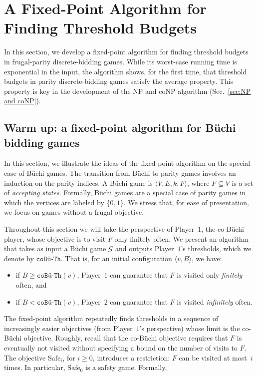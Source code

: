 \documentclass{theoretics}
\newcommand{\PO}{Player~$1$\xspace}
\newcommand{\PT}{Player~$2$\xspace}
\newcommand{\G}{{\mathcal G}}
\newcommand{\coTh}{\texttt{coB\"u-Th}}
\newcommand{\safe}{\text{Safe}}
\newcommand{\zug}[1]{\langle #1  \rangle}
\renewcommand{\set}[1]{\{ #1  \}}
\begin{document}
\section{A Fixed-Point Algorithm for Finding Threshold Budgets}
In this section, we develop a fixed-point algorithm for finding threshold budgets in frugal-parity discrete-bidding games. While its worst-case running time is exponential in the input, the algorithm shows, for the first time, that threshold budgets in parity discrete-bidding games satisfy the average property. This property is key in the development of the NP and coNP algorithm (Sec.~\ref{sec:NP and coNP}). 


\subsection{Warm up: a fixed-point algorithm for B\"uchi bidding games}
\label{sec:Buchi}
In this section, we illustrate the ideas of the fixed-point algorithm on the special case of B\"uchi games. The transition from B\"uchi to parity games involves an induction on the parity indices. A B\"uchi game is $\zug{V, E, k, F}$, where $F \subseteq V$ is a set of {\em accepting states}. Formally, B\"uchi games are a special case of parity games in which the vertices are labeled by $\set{0,1}$. We stress that, for ease of presentation, we focus on games without a frugal objective.

Throughout this section we will take the perspective of \PO, the co-B\"uchi player, whose objective is to visit $F$ only finitely often. We present an algorithm that takes as input a B\"uchi game $\G$ and outputs \PO's thresholds, which we denote by $\coTh$. That is, for an initial configuration $\zug{v, B}$, we have:
\begin{itemize}
\item if $B \geq \coTh(v)$, \PO can guarantee that $F$ is visited only {\em finitely} often, and
\item if $B < \coTh(v)$, \PT can guarantee that $F$ is visited {\em infinitely} often.
\end{itemize}

The fixed-point algorithm repeatedly finds thresholds in a sequence of increasingly easier objectives (from \PO's perspective) whose limit is the co-B\"uchi objective. 
Roughly, recall that the co-B\"uchi objective requires that $F$ is eventually not visited without specifying a bound on the number of visits to $F$. The objective $\safe_i$, for $i \geq 0$, introduces a restriction: $F$ can be visited at most~$i$ times. In particular, $\safe_0$ is a safety game. Formally, 
\end{document}
